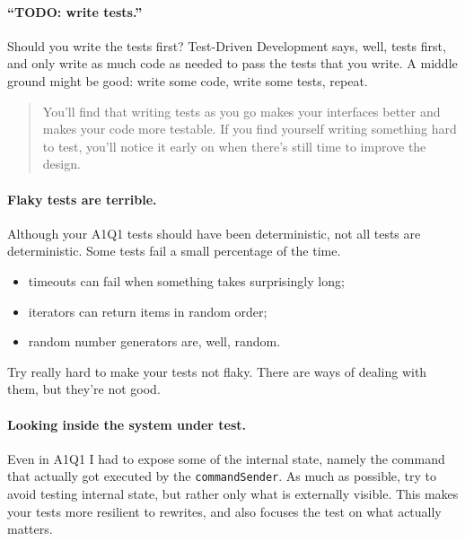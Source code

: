 \documentclass[11pt]{article}
\begin{document}
\paragraph{``TODO: write tests.''} Should you write the tests first? Test-Driven Development says, well,
tests first, and only write as much code as needed to pass the tests that you write. 
A middle ground might be good: write some code, write some tests, repeat.

\begin{quote}
You'll find that writing tests as you go makes your interfaces better and makes your code more testable. If you find yourself writing something hard to test, you’ll notice it early on when there’s still time to improve the design.
\end{quote}

\paragraph{Flaky tests are terrible.} Although your A1Q1 tests should have been 
deterministic, not all tests are deterministic. Some tests fail a small percentage
of the time. 
\begin{itemize}
\item timeouts can fail when something takes surprisingly long;
\item iterators can return items in random order;
\item random number generators are, well, random.
\end{itemize}
Try really hard to make your tests not flaky. There are ways of dealing with them,
but they're not good.

\paragraph{Looking inside the system under test.}
Even in A1Q1 I had to expose some of the internal state, namely the command that actually
got executed by the {\tt commandSender}. As much as possible, try to avoid testing internal
state, but rather only what is externally visible. This makes your tests more resilient to rewrites,
and also focuses the test on what actually matters.
\end{document}

